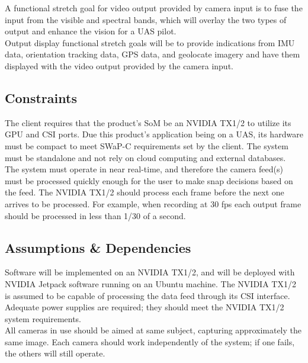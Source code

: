 \documentclass[letterpaper,10pt,serif,draftclsnofoot,onecolumn,compsoc,titlepage]{IEEEtran}
\begin{document}
A functional stretch goal for video output provided by camera input is to fuse the 
input from the visible and spectral bands, which will overlay the two types of output 
and enhance the vision for a UAS pilot. \\

Output display functional stretch goals will be to provide indications from IMU data, 
orientation tracking data, GPS data, and geolocate imagery and have them displayed 
with the video output provided by the camera input. \\

\subsection{Constraints}

The client requires that the product's SoM be an NVIDIA TX1/2 to utilize its GPU 
and CSI ports. Due this product's application being on a UAS, its hardware must be 
compact to meet SWaP-C requirements set by the client. The system must be standalone 
and not rely on cloud computing and external databases. \\

The system must operate in near real-time, and therefore the camera feed(s) must be 
processed quickly enough for the user to make snap decisions based on the feed. The 
NVIDIA TX1/2 should process each frame before the next one arrives to be processed. 
For example, when recording at 30 fps each output frame should be processed in 
less than 1/30 of a second.\\

\subsection{Assumptions \& Dependencies}

Software will be implemented on an NVIDIA TX1/2, and will be deployed with NVIDIA 
Jetpack software running on an Ubuntu machine. The NVIDIA TX1/2 is assumed to be 
capable of processing the data feed through its CSI interface. \\

Adequate power supplies are required; they should meet the NVIDIA TX1/2 system 
requirements. \\

All cameras in use should be aimed at same subject, capturing approximately the same 
image. Each camera should work independently of the system; if one fails, the others 
will still operate.\\
\end{document}
